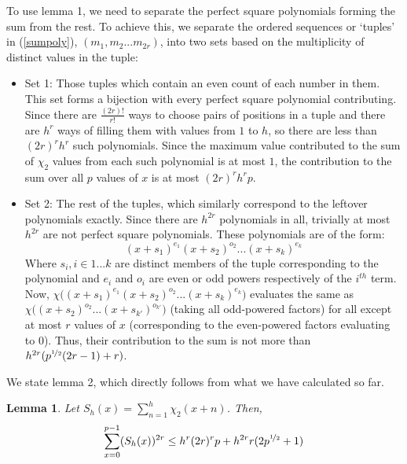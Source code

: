 \documentclass{report}
\newtheorem{lemma}{Lemma}
\begin{document}
To use lemma 1, we need to separate the perfect square polynomials forming the sum from the rest. To achieve this, we separate the ordered sequences or `tuples' in (\ref{sumpoly}), $(m_1, m_2...m_{2r})$, into two sets based on the multiplicity of distinct values in the tuple:
\begin{itemize}
  \item Set 1: Those tuples which contain an even count of each number in them. This set forms a bijection with every perfect square polynomial contributing. Since there are $\frac{(2r)!}{r!}$ ways to choose pairs of positions in a tuple and there are $h^{r}$ ways of filling them with values from $1$ to $h$, so there are less than $(2r)^r h^{r}$ such polynomials. Since the maximum value contributed to the sum of $\chi_2$ values from each such polynomial is at most $1$, the contribution to the sum over all $p$ values of $x$ is at most $(2r)^r h^{r}p$.
  \item Set 2: The rest of the tuples, which similarly correspond to the leftover polynomials exactly. Since there are $h^{2r}$ polynomials in all, trivially at most $h^{2r}$ are not perfect square polynomials. These polynomials are of the form:
  $$(x+s_1)^{e_1}(x+s_2)^{o_2}...(x+s_k)^{e_k}$$
  Where $s_i, i\in 1...k$ are distinct members of the tuple corresponding to the polynomial and $e_i$ and $o_i$ are even or odd powers respectively of the $i^{th}$ term. Now, $\chi\big((x+s_1)^{e_1}(x+s_2)^{o_2}...(x+s_k)^{e_k}\big)$ evaluates the same as $\chi\big((x+s_2)^{o_2}...(x+s_{k'})^{o_{k'}}\big)$ (taking all odd-powered factors) for all except at most $r$ values of $x$ (corresponding to the even-powered factors evaluating to $0$). Thus, their contribution to the sum is not more than $h^{2r}(p^{\nicefrac{1}{2}}(2r-1)+r)$.
\end{itemize}
%
We state lemma 2, which directly follows from what we have calculated so far.
%
\begin{lemma}
Let $S_h(x)=\sum\limits_{n=1}^{h}\chi_2(x+n)$. Then,
\begin{equation} \label{lemma2}
\sum\limits_{x=0}^{p-1}(S_h(x))^{2r}\leq h^{r}(2r)^{r}p+h^{2r}r(2p^{\nicefrac{1}{2}}+1)
\end{equation}
\end{lemma}
\end{document}
